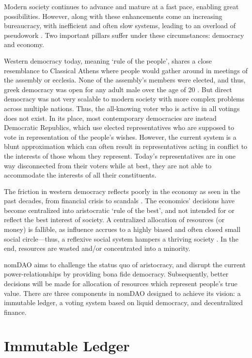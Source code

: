 \documentclass[12pt]{article}
\begin{document}
Modern society continues to advance and mature at a fast pace, enabling great possibilities. However, along with these enhancements come an increasing bureaucracy,  with inefficient and often slow systems, leading to an overload of pseudowork \cite{pseudowork}. Two important pillars suffer under these circumstances: democracy and economy. 

Western democracy today, meaning ‘rule of the people’, shares a close resemblance to Classical Athens \cite{ClassicalAthens} where people would gather around in meetings of the assembly or ecclesia. None of the assembly’s members were elected, and thus, greek democracy was open for any adult male over the age of 20 \cite{directDemocracy}. But direct democracy was not very scalable to modern society with more complex problems across multiple nations. Thus, the all-knowing voter who is active in all votings does not exist. In its place, most contemporary democracies are instead Democratic Republics, which use elected representatives who are supposed to vote in representation of the people's wishes. However, the current system is a blunt approximation which can often result in representatives acting in conflict to the interests of those whom they represent. Today’s representatives are in one way disconnected from their voters while at best, they are not able to accommodate the interests of all their constituents. 

The friction in western democracy reflects poorly in the economy as seen in the past decades, from financial crisis \cite{financialCrisis} to scandals \cite{panama, pandora}. The economics' decisions have become centralized into aristocratic ‘rule of the best’, and not intended for or reflect the best interest of society. A centralized allocation of resources (or money) is fallible, as influence accrues to a highly biased and often closed small social circle—thus, a reflexive social system hampers a thriving society \cite{reflexivity}. In the end, resources are wasted and/or concentrated into a minority.

nomDAO aims to challenge the status quo of aristocracy, and disrupt the current power-relationships by providing bona fide democracy. Subsequently, better decisions will be made for allocation of resources which represent people’s true value. There are three components in nomDAO designed to achieve its vision: a immutable ledger, a voting system based on liquid democracy, and decentralized finance.


\section*{Immutable Ledger}
\end{document}
